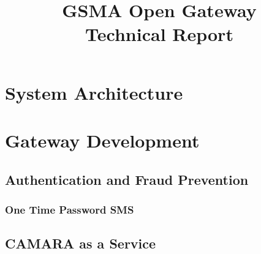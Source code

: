 \documentclass[code,math,bibliography]{relatorio-deti}
\title{GSMA Open Gateway\\[20pt]Technical Report}
\begin{document}
\maketitle

%
%



\tableofcontents

\clearpage







\chapter{System Architecture}

\chapter{Gateway Development}



\section{Authentication and Fraud Prevention}
\subsection{One Time Password SMS}
\section{CAMARA as a Service}







\printbibliography[heading=bibintoc]
\end{document}
